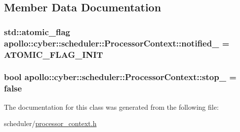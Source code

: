 \subsection{Member Data Documentation}
\hypertarget{classapollo_1_1cyber_1_1scheduler_1_1ProcessorContext_ad4e0ac53246d1d65b4d14a1f438715e3}{
\subsubsection[{notified\-\_\-}]{\setlength{\rightskip}{0pt plus 5cm}std\-::atomic\-\_\-flag apollo\-::cyber\-::scheduler\-::\-Processor\-Context\-::notified\-\_\- = A\-T\-O\-M\-I\-C\-\_\-\-F\-L\-A\-G\-\_\-\-I\-N\-I\-T\hspace{0.3cm}{\ttfamily [protected]}}}\label{classapollo_1_1cyber_1_1scheduler_1_1ProcessorContext_ad4e0ac53246d1d65b4d14a1f438715e3}
\hypertarget{classapollo_1_1cyber_1_1scheduler_1_1ProcessorContext_a19eebaac060d52fb252077f59762a97e}{
\subsubsection[{stop\-\_\-}]{\setlength{\rightskip}{0pt plus 5cm}bool apollo\-::cyber\-::scheduler\-::\-Processor\-Context\-::stop\-\_\- = false\hspace{0.3cm}{\ttfamily [protected]}}}\label{classapollo_1_1cyber_1_1scheduler_1_1ProcessorContext_a19eebaac060d52fb252077f59762a97e}


The documentation for this class was generated from the following file\-:\begin{DoxyCompactItemize}
\item 
scheduler/\hyperlink{processor__context_8h}{processor\-\_\-context.\-h}\end{DoxyCompactItemize}
